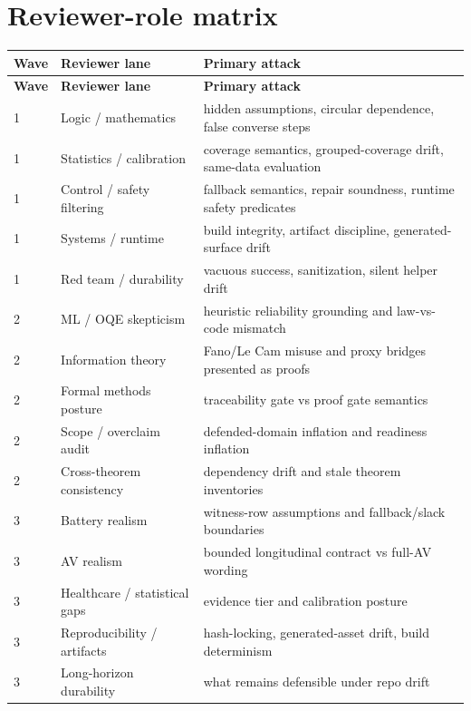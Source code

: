 \documentclass[11pt,oneside]{report}
\begin{document}
\section*{Reviewer-role matrix}
\begin{longtable}{p{}p{}p{}}
\toprule
\textbf{Wave} & \textbf{Reviewer lane} & \textbf{Primary attack}\\
\midrule
\endfirsthead
\toprule
\textbf{Wave} & \textbf{Reviewer lane} & \textbf{Primary attack}\\
\midrule
\endhead
1 & Logic / mathematics & hidden assumptions, circular dependence, false converse steps\\
1 & Statistics / calibration & coverage semantics, grouped-coverage drift, same-data evaluation\\
1 & Control / safety filtering & fallback semantics, repair soundness, runtime safety predicates\\
1 & Systems / runtime & build integrity, artifact discipline, generated-surface drift\\
1 & Red team / durability & vacuous success, sanitization, silent helper drift\\
2 & ML / OQE skepticism & heuristic reliability grounding and law-vs-code mismatch\\
2 & Information theory & Fano/Le Cam misuse and proxy bridges presented as proofs\\
2 & Formal methods posture & traceability gate vs proof gate semantics\\
2 & Scope / overclaim audit & defended-domain inflation and readiness inflation\\
2 & Cross-theorem consistency & dependency drift and stale theorem inventories\\
3 & Battery realism & witness-row assumptions and fallback/slack boundaries\\
3 & AV realism & bounded longitudinal contract vs full-AV wording\\
3 & Healthcare / statistical gaps & evidence tier and calibration posture\\
3 & Reproducibility / artifacts & hash-locking, generated-asset drift, build determinism\\
3 & Long-horizon durability & what remains defensible under repo drift\\
\bottomrule
\end{longtable}
\end{document}
